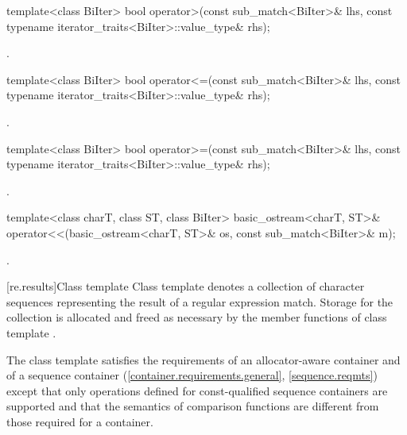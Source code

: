 %
\begin{itemdecl}
template<class BiIter>
  bool operator>(const sub_match<BiIter>& lhs,
                 const typename iterator_traits<BiIter>::value_type& rhs);
\end{itemdecl}

\begin{itemdescr}
\pnum
\returns {}.
\end{itemdescr}

%
\begin{itemdecl}
template<class BiIter>
  bool operator<=(const sub_match<BiIter>& lhs,
                  const typename iterator_traits<BiIter>::value_type& rhs);
\end{itemdecl}

\begin{itemdescr}
\pnum
\returns {}.
\end{itemdescr}

%
\begin{itemdecl}
template<class BiIter>
  bool operator>=(const sub_match<BiIter>& lhs,
                  const typename iterator_traits<BiIter>::value_type& rhs);
\end{itemdecl}

\begin{itemdescr}
\pnum
\returns {}.
\end{itemdescr}

%
%
\begin{itemdecl}
template<class charT, class ST, class BiIter>
  basic_ostream<charT, ST>&
    operator<<(basic_ostream<charT, ST>& os, const sub_match<BiIter>& m);
\end{itemdecl}

\begin{itemdescr}
\pnum\returns {}.
\end{itemdescr}

[re.results]{Class template }
\pnum
{}%
Class template  denotes a collection of character
sequences representing the result of a regular expression
match. Storage for the collection is allocated and freed as necessary
by the member functions of class template .

\pnum
{}%
%
%
The class template  satisfies the requirements of an
allocator-aware container and of a sequence container
(\ref{container.requirements.general}, \ref{sequence.reqmts})
except that only operations defined for const-qualified
sequence containers are supported and
that the semantics of comparison functions are different from those
required for a container.

